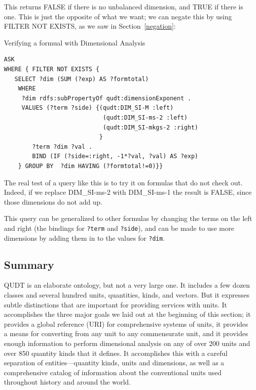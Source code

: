 This returns FALSE if there is no unbalanced dimension, and TRUE if there is one. 
This is just the opposite of what we want; we can negate this by using
FILTER NOT EXISTS, as we saw in Section~\ref{negation}:



\begin{query}Verifying a formual with Dimensional Analysis\end{query}
\begin{lstlisting}
ASK  
WHERE { FILTER NOT EXISTS {
   SELECT ?dim (SUM (?exp) AS ?formtotal)
    WHERE 
     ?dim rdfs:subPropertyOf qudt:dimensionExponent .
     VALUES (?term ?side) {(qudt:DIM_SI-M :left)
                            (qudt:DIM_SI-ms-2 :left)
                            (qudt:DIM_SI-mkgs-2 :right)
                           }
        ?term ?dim ?val .
        BIND (IF (?side=:right, -1*?val, ?val) AS ?exp)
    } GROUP BY  ?dim HAVING (?formtotal!=0)}}
\end{lstlisting}

The real test of a query like this is to try it on formulas that do not
check out. Indeed, if we replace DIM\_SI-ms-2 with DIM\_SI-ms-1 the result 
is FALSE, since those dimensions do not
add up.

This query can be generalized to other formulas by changing the terms on 
the left and right (the bindings for \texttt{?term} and \texttt{?side}), and can
be made to use more dimensions by adding them in to the values for \texttt{?dim}.




\subsection{Summary}

QUDT is an elaborate ontology, but not a very large one. It includes a
few dozen classes and several hundred units, quantities, kinds, and vectors.
But it expresses subtle distinctions that are important for providing
services with units. It accomplishes the three major goals we laid out
at
the beginning of this section; it provides a global reference (URI) for
comprehensive systems of units, it provides a means for converting from
any unit to any commensurate unit, and it provides enough information to
perform dimensional analysis on any of over 200 units and over 850 quantity kinds that it defines.
It accomplishes this with a careful separation of entities---quantity kinds,
units and dimensions, as well as a comprehensive catalog of information
about the conventional units used throughout history and around the
world.


